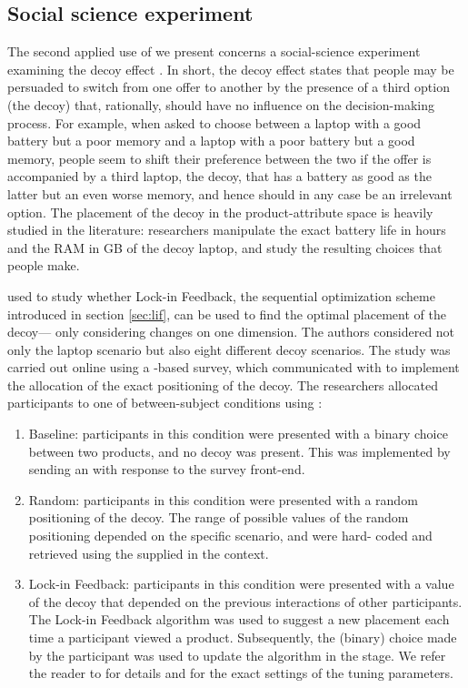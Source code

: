 \documentclass[nojss]{jss}
\begin{document}
\subsection{Social science experiment}

The second applied use of  we present concerns a social-science experiment examining the decoy effect \citep[see][for a full description of the experiment]{kaptein2016tracking}. In short, the decoy effect states that people may be persuaded to switch from one offer to another by the presence of a third option (the decoy) that, rationally, should have no influence on the decision-making process. For example, when asked to choose between a laptop with a good battery but a poor memory and a laptop with a poor battery but a good memory, people seem to shift their preference between the two if the offer is accompanied by a third laptop, the decoy, that has a battery as good as the latter but an even worse memory, and hence should in any case be an irrelevant option. The placement of the decoy in the product-attribute space is heavily studied in the literature: researchers manipulate the exact battery life in hours and the RAM in GB of the decoy laptop, and study the resulting choices that people make.

\citet{kaptein2016tracking} used  to study whether Lock-in Feedback, the sequential optimization scheme introduced in section \ref{sec:lif}, can be used to find the optimal placement of the decoy--- only considering changes on one dimension. The authors considered not only the laptop scenario but also eight different decoy scenarios. The study was carried out online using a -based survey, which communicated with  to implement the allocation of the exact positioning of the decoy. The researchers allocated participants to one of  between-subject conditions using :
\begin{enumerate}
\item Baseline: participants in this condition were presented with a binary choice between two products, and no decoy was present. This was implemented by sending an  with	 response to the survey front-end.
\item Random: participants in this condition were presented with a random positioning of the decoy. The range of possible values of the random positioning depended on the specific scenario, and were hard- coded and retrieved using the  supplied in the context.
\item Lock-in Feedback: participants in this condition were presented with a value of the decoy that depended on the previous interactions of other participants. The Lock-in Feedback algorithm was used to suggest a new placement each time a participant viewed a product. Subsequently, the (binary) choice made by the participant was used to update the algorithm in the  stage. We refer the reader to \citep{kaptein2016tracking} for details and for the exact settings of the tuning parameters.
\end{enumerate}
\end{document}
